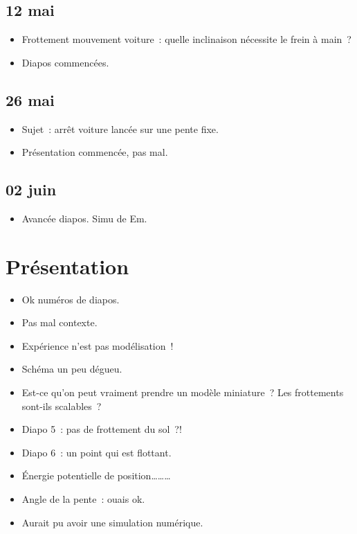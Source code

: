 \documentclass[a4paper, 11pt, final, garamond]{book}
\begin{document}
\subsection{12 mai}
\begin{itemize}
  \item Frottement mouvement voiture~: quelle inclinaison nécessite le frein à
    main~?
  \item Diapos commencées.
\end{itemize}

\subsection{26 mai}
\begin{itemize}
  \item Sujet~: arrêt voiture lancée sur une pente fixe.
  \item Présentation commencée, pas mal.
\end{itemize}

\subsection{02 juin}
\begin{itemize}
  \item Avancée diapos. Simu de Em.
\end{itemize}

\section{Présentation}

\begin{itemize}
  \item Ok numéros de diapos.
  \item Pas mal contexte.
  \item Expérience n'est pas modélisation~!
  \item Schéma un peu dégueu.
  \item Est-ce qu'on peut vraiment prendre un modèle miniature~? Les frottements
    sont-ils scalables~?
  \item Diapo 5~: pas de frottement du sol~?!
  \item Diapo 6~: un point qui est flottant.
  \item Énergie potentielle de position………
  \item Angle de la pente~: ouais ok.
  \item Aurait pu avoir une simulation numérique.
\end{itemize}
\end{document}

